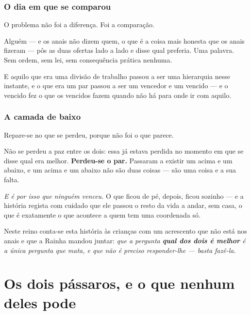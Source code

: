 \documentclass[livro.tex]{subfiles}
\begin{document}
\subsection*{O dia em que se comparou}

O problema não foi a diferença. Foi a comparação.

\medskip

Alguém --- e os anais não dizem quem, o que é a coisa mais honesta que os anais fizeram --- pôs as
duas ofertas lado a lado e disse qual preferia. Uma palavra. Sem ordem, sem lei, sem consequência
prática nenhuma.

\medskip

E aquilo que era uma divisão de trabalho passou a ser uma hierarquia nesse instante, e o que era
um par passou a ser um vencedor e um vencido --- e o vencido fez o que os vencidos fazem quando
não há para onde ir com aquilo.

\subsection*{A camada de baixo}

Repare-se no que se perdeu, porque não foi o que parece.

\medskip

Não se perdeu a paz entre os dois: essa já estava perdida no momento em que se disse qual era
melhor. \textbf{Perdeu-se o par.} Passaram a existir um acima e um abaixo, e um acima e um abaixo
não são duas coisas --- são uma coisa e a sua falta.

\medskip

\emph{E é por isso que ninguém venceu.} O que ficou de pé, depois, ficou sozinho --- e a história
regista com cuidado que ele passou o resto da vida a andar, sem casa, o que é exatamente o que
acontece a quem tem uma coordenada só.

\medskip

Neste reino conta-se esta história às crianças com um acrescento que não está nos anais e que a
Rainha mandou juntar: \emph{que a pergunta \textbf{qual dos dois é melhor} é a única pergunta que
mata, e que não é preciso responder-lhe --- basta fazê-la.}


\chapter{Os dois pássaros, e o que nenhum deles pode}
\end{document}
